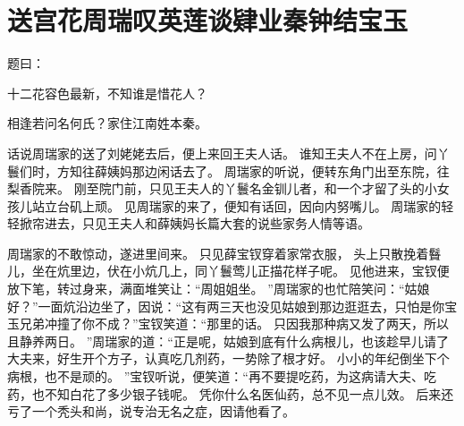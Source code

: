 \chapter{送宫花周瑞叹英莲\quad 谈肄业秦钟结宝玉}
\par
{}\par
题曰：\par
十二花容色最新，不知谁是惜花人？\par
相逢若问名何氏？家住江南姓本秦。
\par
\hop
话说周瑞家的送了刘姥姥去后，便上来回王夫人话。
谁知王夫人不在上房，问丫鬟们时，方知往薛姨妈那边闲话去了。
周瑞家的听说，便转东角门出至东院，往梨香院来。
刚至院门前，只见王夫人的丫鬟名金钏儿者，和一个才留了头的小女孩儿站立台矶上顽。
见周瑞家的来了，便知有话回，因向内努嘴儿。
周瑞家的轻轻掀帘进去，只见王夫人和薛姨妈长篇大套的说些家务人情等语。
\par
周瑞家的不敢惊动，遂进里间来。
只见薛宝钗穿着家常衣服， 头上只散挽着䰖儿，坐在炕里边，伏在小炕几上，同丫鬟莺儿正描花样子呢。
见他进来，宝钗便放下笔，转过身来，满面堆笑让：“周姐姐坐。
”周瑞家的也忙陪笑问：“姑娘好？”一面炕沿边坐了，因说：“这有两三天也没见姑娘到那边逛逛去，只怕是你宝玉兄弟冲撞了你不成？”宝钗笑道：“那里的话。
只因我那种病又发了两天，所以且静养两日。
”周瑞家的道：“正是呢，姑娘到底有什么病根儿，也该趁早儿请了大夫来，好生开个方子，认真吃几剂药，一势除了根才好。
小小的年纪倒坐下个病根，也不是顽的。
”宝钗听说，便笑道：“再不要提吃药，为这病请大夫、吃药，也不知白花了多少银子钱呢。
凭你什么名医仙药，总不见一点儿效。
后来还亏了一个秃头和尚，说专治无名之症，因请他看了。
